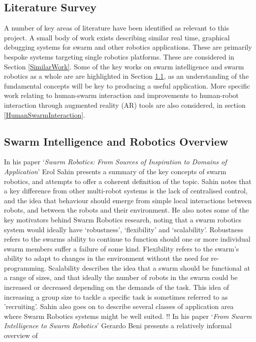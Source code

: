 \documentclass[titlepage,hidelinks,10pt]{article}
\begin{document}
\begin{multicols*}{2}
\section{Literature Survey}
A number of key areas of literature have been identified as relevant to this project. A small body of work exists describing similar real time, graphical debugging systems for swarm and other robotics applications. These are primarily bespoke systems targeting single robotics platforms. These are considered in Section \ref{SimilarWork}. Some of the key works on swarm intelligence and swarm robotics as a whole are are highlighted in Section \ref{GeneralSR}, as an understanding of the fundamental concepts will be key to producing a useful application.  More specific work relating to human-swarm interaction and improvements to human-robot interaction through augmented reality (AR) tools are also considered, in section \ref{HumanSwarmInteraction}.

\subsection{Swarm Intelligence and Robotics Overview} \label{GeneralSR}
In his paper `\textit{Swarm Robotics: From Sources of Inspiration to Domains of Application}' Erol Sahin presents a summary of the key concepts of swarm robotics\cite{InspirationToApplication}, and attempts to offer a coherent definition of the topic. Sahin notes that a key difference from other multi-robot systems is the lack of centralised control, and the idea that behaviour should emerge from simple local interactions between robots, and between the robots and their environment. He also notes some of the key motivators behind Swarm Robotics research, noting that a swarm robotics system would ideally have `robustness', `flexibility' and `scalability'. Robustness refers to the swarms ability to continue to function should one or more individual swarm members suffer a failure of some kind. Flexibility refers to the swarm's ability to adapt to changes in the environment without the need for re-programming. Scalability describes the idea that a swarm should be functional at a range of sizes, and that ideally the number of robots in the swarm could be increased or decreased depending on the demands of the task. This idea of increasing a group size to tackle a specific task is sometimes referred to as 'recruiting'\cite{Recruiting}. Sahin also goes on to describe several classes of application area where Swarm Robotics systems might be well suited. !! In his paper `\textit{From Swarm Intelligence to Swarm Robotics}' Gerardo Beni presents a relatively informal overview of 


\end{multicols*}
\end{document}
